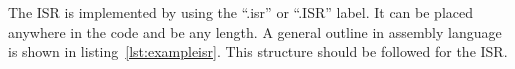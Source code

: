 The ISR is implemented by using the ``.isr'' or ``.ISR'' label. 
It can be placed anywhere in the code and be any length.
A general outline in assembly language is shown in listing~\ref{lst:exampleisr}. 
This structure should be followed for the ISR.






